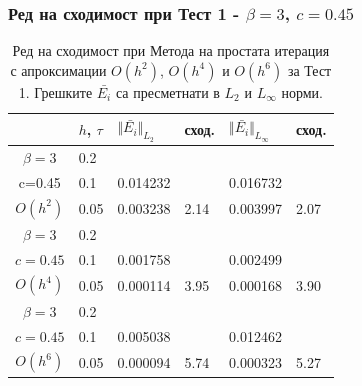 \documentclass{beamer}
\begin{document}
\begin{frame}
\frametitle{Ред на сходимост при Тест 1 - $\beta = 3$, $c=0.45$}

\begin{table}[ht]
\centering
		\begin{tabular}{||c|l|ll|ll||}
			\hline
			\hline
             & $h$, $\tau$  &  	$\Vert \bar{ E_i} \Vert_{L_2}$ 	& сход.	& $\Vert \bar{ E_i} \Vert_{L_\infty}$  		&сход.   \\
   					\hline 
					\hline 
$\beta = 3$   	&0.2    										&            &            &           &   \\
      c=0.45 	&0.1    & 0.014232  						&            & 0.016732 			&   \\
   $O(h^2)$     &0.05   & 0.003238  						&2.14  & 0.003997					& 2.07 \\
\hline 
$\beta = 3$   	&0.2   &            &            &             &    \\
      $c=0.45 $ &0.1   &   0.001758   &           &  0.002499  &   \\
       $O(h^4)$	&0.05  &  0.000114 & 3.95    & 0.000168  & 3.90  \\
\hline
$\beta = 3$   	&0.2   &            &        &                  &      \\
   $c=0.45$   	&0.1   &  0.005038 &           & 0.012462       &       \\
     $O(h^6)$	&0.05  &  0.000094  & 5.74  &  0.000323 & 5.27         \\
			\hline
			\hline 
		\end{tabular}
		\caption{Ред на сходимост при Метода на простата итерация с апроксимации $O(h^{2})$, $O(h^{4})$ и $O(h^{6})$ за Тест  1. Грешките $\bar{ E_i}$ са пресметнати в $L_2$ и $L_\infty$ норми.}
\label{tab:aA}
\end{table}

\end{frame}
\end{document}
